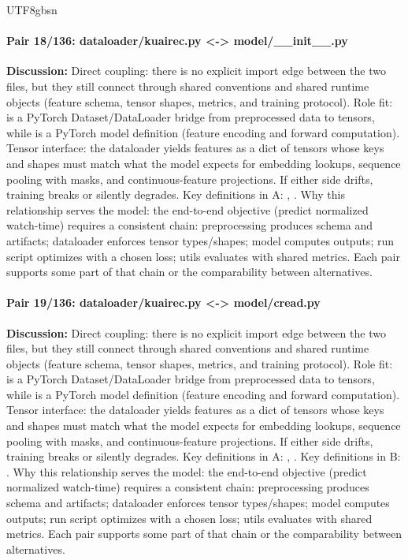 \documentclass[11pt]{article}
\begin{document}
\begin{CJK*}{UTF8}{gbsn}
\paragraph{Pair 18/136: dataloader/kuairec.py <-> model/\_\_init\_\_.py}
\textbf{Discussion:} Direct coupling: there is no explicit import edge between the two files, but they still connect through shared conventions and shared runtime objects (feature schema, tensor shapes, metrics, and training protocol). Role fit: \texttt{} is a PyTorch Dataset/DataLoader bridge from preprocessed data to tensors, while \texttt{} is a PyTorch model definition (feature encoding and forward computation). Tensor interface: the dataloader yields features as a dict of tensors whose keys and shapes must match what the model expects for embedding lookups, sequence pooling with masks, and continuous-feature projections. If either side drifts, training breaks or silently degrades. Key definitions in A: \texttt{}, \texttt{}. Why this relationship serves the model: the end-to-end objective (predict normalized watch-time) requires a consistent chain: preprocessing produces schema and artifacts; dataloader enforces tensor types/shapes; model computes outputs; run script optimizes with a chosen loss; utils evaluates with shared metrics. Each pair supports some part of that chain or the comparability between alternatives.

\paragraph{Pair 19/136: dataloader/kuairec.py <-> model/cread.py}
\textbf{Discussion:} Direct coupling: there is no explicit import edge between the two files, but they still connect through shared conventions and shared runtime objects (feature schema, tensor shapes, metrics, and training protocol). Role fit: \texttt{} is a PyTorch Dataset/DataLoader bridge from preprocessed data to tensors, while \texttt{} is a PyTorch model definition (feature encoding and forward computation). Tensor interface: the dataloader yields features as a dict of tensors whose keys and shapes must match what the model expects for embedding lookups, sequence pooling with masks, and continuous-feature projections. If either side drifts, training breaks or silently degrades. Key definitions in A: \texttt{}, \texttt{}. Key definitions in B: \texttt{}. Why this relationship serves the model: the end-to-end objective (predict normalized watch-time) requires a consistent chain: preprocessing produces schema and artifacts; dataloader enforces tensor types/shapes; model computes outputs; run script optimizes with a chosen loss; utils evaluates with shared metrics. Each pair supports some part of that chain or the comparability between alternatives.


\end{CJK*}
\end{document}
